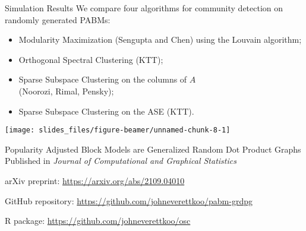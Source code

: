 \documentclass[
  ignorenonframetext,
]{beamer}
\providecommand{\tightlist}{%
  \setlength{\itemsep}{0pt}\setlength{\parskip}{0pt}}
\begin{document}
\begin{frame}{Simulation Results}
\protect\hypertarget{simulation-results}{}
We compare four algorithms for community detection on randomly generated
PABMs:

\begin{itemize}
\tightlist
\item
  Modularity Maximization (Sengupta and Chen) using the Louvain
  algorithm;
\item
  Orthogonal Spectral Clustering (KTT);
\item
  Sparse Subspace Clustering on the columns of \(A\)\\
  (Noorozi, Rimal, Pensky);
\item
  Sparse Subspace Clustering on the ASE (KTT).
\end{itemize}

\begin{center}\texttt{[image: slides\_files/figure-beamer/unnamed-chunk-8-1]} \end{center}
\end{frame}

\begin{frame}{Popularity Adjusted Block Models are Generalized Random
Dot Product Graphs}
\protect\hypertarget{popularity-adjusted-block-models-are-generalized-random-dot-product-graphs}{}
Published in \emph{Journal of Computational and Graphical Statistics}

arXiv preprint: \url{https://arxiv.org/abs/2109.04010}

GitHub repository: \url{https://github.com/johneverettkoo/pabm-grdpg}

R package: \url{https://github.com/johneverettkoo/osc}
\end{frame}
\end{document}

